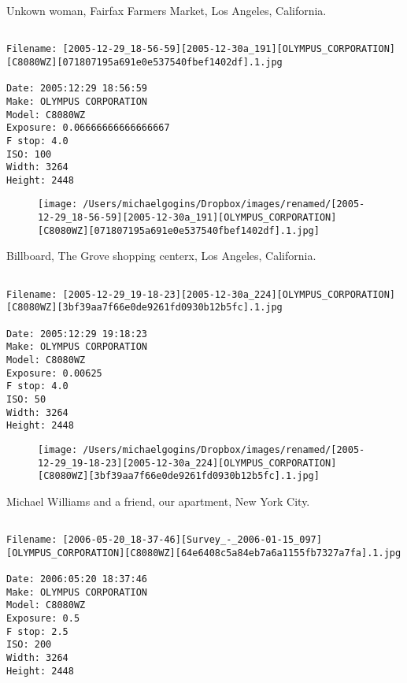 \documentclass[11pt,letter,DIV=14,paper=landscape]{scrbook}
\begin{document}
\clearpage
\noindent Unkown woman, Fairfax Farmers Market, Los Angeles, California.
\noindent
\begin{lstlisting}

Filename: [2005-12-29_18-56-59][2005-12-30a_191][OLYMPUS_CORPORATION][C8080WZ][071807195a691e0e537540fbef1402df].1.jpg

Date: 2005:12:29 18:56:59
Make: OLYMPUS CORPORATION
Model: C8080WZ
Exposure: 0.06666666666666667
F stop: 4.0
ISO: 100
Width: 3264
Height: 2448
\end{lstlisting}
\clearpage

\begin{figure}
\texttt{[image: /Users/michaelgogins/Dropbox/images/renamed/[2005-12-29\_18-56-59][2005-12-30a\_191][OLYMPUS\_CORPORATION][C8080WZ][071807195a691e0e537540fbef1402df].1.jpg]}
\end{figure}
    
\clearpage
\noindent Billboard, The Grove shopping centerx, Los Angeles, California.
\noindent
\begin{lstlisting}

Filename: [2005-12-29_19-18-23][2005-12-30a_224][OLYMPUS_CORPORATION][C8080WZ][3bf39aa7f66e0de9261fd0930b12b5fc].1.jpg

Date: 2005:12:29 19:18:23
Make: OLYMPUS CORPORATION
Model: C8080WZ
Exposure: 0.00625
F stop: 4.0
ISO: 50
Width: 3264
Height: 2448
\end{lstlisting}
\clearpage

\begin{figure}
\texttt{[image: /Users/michaelgogins/Dropbox/images/renamed/[2005-12-29\_19-18-23][2005-12-30a\_224][OLYMPUS\_CORPORATION][C8080WZ][3bf39aa7f66e0de9261fd0930b12b5fc].1.jpg]}
\end{figure}
    
\clearpage
\noindent Michael Williams and a friend, our apartment, New York City.
\noindent
\begin{lstlisting}

Filename: [2006-05-20_18-37-46][Survey_-_2006-01-15_097][OLYMPUS_CORPORATION][C8080WZ][64e6408c5a84eb7a6a1155fb7327a7fa].1.jpg

Date: 2006:05:20 18:37:46
Make: OLYMPUS CORPORATION
Model: C8080WZ
Exposure: 0.5
F stop: 2.5
ISO: 200
Width: 3264
Height: 2448
\end{lstlisting}
\clearpage
\end{document}
